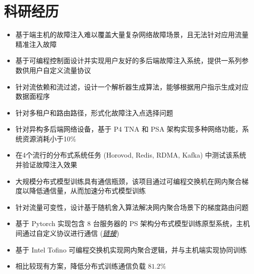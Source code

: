 \documentclass{resume}
\begin{document}

\section{科研经历}

\begin{itemize}[parsep=0.5ex]
  \item 基于端主机的故障注入难以覆盖大量复杂网络故障场景，且无法针对应用流量精准注入故障
  \item 基于可编程控制面设计并实现用户友好的多后端故障注入系统，提供一系列参数供用户自定义流量协议
  \item 针对流依赖和流过滤，设计一个解析器生成算法，能够根据用户指示生成对应数据面程序
  \item 针对多租户和路由路径，形式化故障注入点选择问题
  \item 针对异构多后端网络设备，基于 P4 TNA 和 PSA 架构实现多种网络功能，系统资源消耗小于10\%
  \item 在4个流行的分布式系统任务 (Horovod, Redis, RDMA, Kafka) 中测试该系统并验证故障注入效果
\end{itemize}

\begin{itemize}[parsep=0.5ex]
  \item 大规模分布式模型训练具有通信瓶颈，该项目通过可编程交换机在网内聚合梯度以降低通信量，从而加速分布式模型训练
  \item 针对流量可变性，设计基于随机舍入算法解决网内聚合场景下的梯度路由问题
  \item 基于 Pytorch 实现包含 8 台服务器的 PS 架构分布式模型训练原型系统，主机间通过自定义协议进行通信 (\href{https://github.com/Fangjin98/distributed-training-INA/}{\textit{链接}})
  \item 基于 Intel Tofino 可编程交换机实现网内聚合逻辑，并与主机端实现协同训练
  \item 相比较现有方案，降低分布式训练通信负载 $81.2\%$
\end{itemize}
\end{document}

